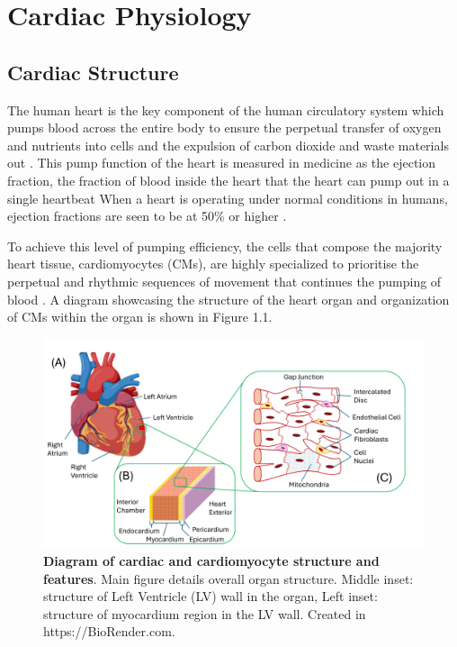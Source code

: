 \section{Cardiac Physiology}
\subsection{Cardiac Structure}
The human heart is the key component of the human circulatory system which pumps blood across the entire body to ensure the perpetual transfer of oxygen and nutrients into cells and the expulsion of carbon dioxide and waste materials out \cite{saltzman_biomedical_2015}. This pump function of the heart is measured in medicine as the ejection fraction, the fraction of blood inside the heart that the heart can pump out in a single heartbeat \cite{golla_heart_2025} When a heart is operating under normal conditions in humans, ejection fractions are seen to be at 50\% or higher \cite{golla_heart_2025}. 

To achieve this level of pumping efficiency, the cells that compose the majority heart tissue, cardiomyocytes (CMs), are highly specialized to prioritise the perpetual and rhythmic sequences of movement that continues the pumping of blood \cite{woodcock_cardiomyocytes_2005}. A diagram showcasing the structure of the heart organ and organization of CMs within the organ is shown in Figure 1.1.

\begin{figure}[H]
    \centering
    \includegraphics[width=0.85\linewidth]{Figures/Figure1.1.png}
    \caption{\textbf{Diagram of cardiac and cardiomyocyte structure and features}. Main figure details overall organ structure. Middle inset: structure of Left Ventricle (LV) wall in the organ, Left inset: structure of myocardium region in the LV wall. Created in  https://BioRender.com.}
    \label{fig:enter-label}
\end{figure}

